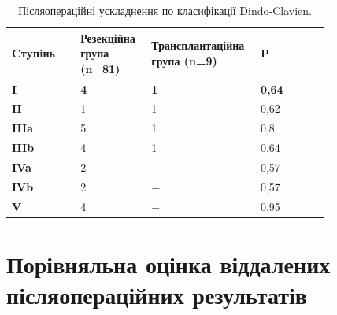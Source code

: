 \begin{table}[]
\centering
\caption{Післяопераційні ускладнення по класифікації Dindo-Clavien.}
\label{tab:dindopac}

\begin{tabular}{|p{0.2\linewidth}|
                 p{0.2\linewidth}|
                 p{0.2\linewidth}|
                 p{0.2\linewidth}|}
\hline
{\color[HTML]{231F20} \textbf{Cтyпiнь}} &
  {\color[HTML]{231F20} \textbf{Резекційна група (n=81)}} &
  {\color[HTML]{231F20} \textbf{Транс\-план\-тацій\-на група (n=9)}} &
  {\color[HTML]{231F20} \textbf{P}} \\ \hline
{\color[HTML]{231F20} \textbf{I}} &
  {\color[HTML]{231F20} \textbf{4}} &
  {\color[HTML]{231F20} \textbf{1}} &
  {\color[HTML]{231F20} \textbf{0,64}} \\ \hline
{\color[HTML]{231F20} \textbf{II}}   & {\color[HTML]{231F20} 1} & {\color[HTML]{231F20} 1} & {\color[HTML]{231F20} 0,62} \\ \hline
{\color[HTML]{231F20} \textbf{IIIa}} & {\color[HTML]{231F20} 5} & {\color[HTML]{231F20} 1} & {\color[HTML]{231F20} 0,8}  \\ \hline
{\color[HTML]{231F20} \textbf{IIIb}} & {\color[HTML]{231F20} 4} & {\color[HTML]{231F20} 1} & {\color[HTML]{231F20} 0,64} \\ \hline
{\color[HTML]{231F20} \textbf{IVa}}  & {\color[HTML]{231F20} 2} & {\color[HTML]{231F20} −} & {\color[HTML]{231F20} 0,57} \\ \hline
{\color[HTML]{231F20} \textbf{IVb}}  & {\color[HTML]{231F20} 2} & {\color[HTML]{231F20} −} & {\color[HTML]{231F20} 0,57} \\ \hline
{\color[HTML]{231F20} \textbf{V}}    & {\color[HTML]{231F20} 4} & {\color[HTML]{231F20} −} & {\color[HTML]{231F20} 0,95} \\ \hline
\end{tabular}
\end{table}


\section{Порівняльна оцінка віддалених післяопераційних результатів}

